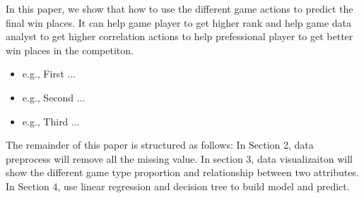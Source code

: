 
In this paper, we show that how to use the different game actions to predict the final win places. It can 
help game player to get higher rank and help game data analyst to get higher correlation actions to help prefessional player
to get better win places in the competiton.

\begin{itemize}
	\item e.g., First ...
	\item e.g., Second ...
	\item e.g., Third ...
\end{itemize}


The remainder of this paper is structured as follows: In Section 2, data preprocess will remove all the missing value.
In section 3, data visualizaiton will show the different game type proportion and relationship between two attributes.
In Section 4, use linear regression and decision tree to build model and predict.

